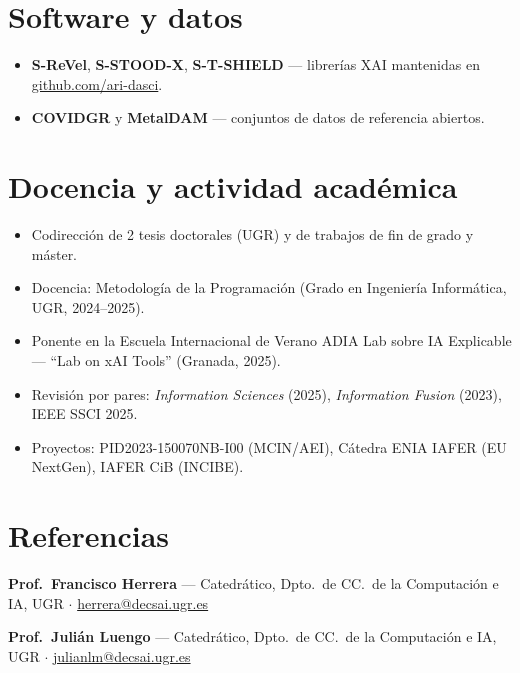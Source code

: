 \documentclass[10pt,a4paper]{article}
\begin{document}
\section*{Software y datos}

\begin{itemize}
  \item \textbf{S-ReVel}, \textbf{S-STOOD-X}, \textbf{S-T-SHIELD} --- librerías XAI mantenidas en \href{https://github.com/ari-dasci}{github.com/ari-dasci}.
  \item \textbf{COVIDGR} y \textbf{MetalDAM} --- conjuntos de datos de referencia abiertos.
\end{itemize}

\section*{Docencia y actividad académica}

\begin{itemize}
  \item Codirección de 2 tesis doctorales (UGR) y de trabajos de fin de grado y máster.
  \item Docencia: Metodología de la Programación (Grado en Ingeniería Informática, UGR, 2024--2025).
  \item Ponente en la Escuela Internacional de Verano ADIA Lab sobre IA Explicable --- ``Lab on xAI Tools'' (Granada, 2025).
  \item Revisión por pares: \textit{Information Sciences} (2025), \textit{Information Fusion} (2023), IEEE SSCI 2025.
  \item Proyectos: PID2023-150070NB-I00 (MCIN/AEI), Cátedra ENIA IAFER (EU NextGen), IAFER CiB (INCIBE).
\end{itemize}

\section*{Referencias}

{\footnotesize
\textbf{Prof.~Francisco Herrera} --- Catedrático, Dpto.~de CC.~de la Computación e IA, UGR $\cdot$ \href{mailto:herrera@decsai.ugr.es}{herrera@decsai.ugr.es}\par
\textbf{Prof.~Julián Luengo} --- Catedrático, Dpto.~de CC.~de la Computación e IA, UGR $\cdot$ \href{mailto:julianlm@decsai.ugr.es}{julianlm@decsai.ugr.es}
\par}
\end{document}
